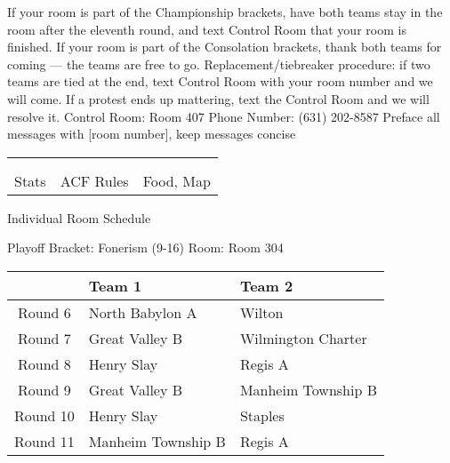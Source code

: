 \documentclass{article}%
\begin{document}
\vspace*{16pt}%
\linebreak%
If your room is part of the Championship brackets, have both teams stay in the room after the eleventh round, and text Control Room that your room is finished.\newline%
\newline%
If your room is part of the Consolation brackets, thank both teams for coming — the teams are free to go.\newline%
\newline%
Replacement/tiebreaker procedure: if two teams are tied at the end, text Control Room with your room number and we will come. If a protest ends up mattering, text the Control Room and we will resolve it.\newline%
\newline%
Control Room: Room 407\newline%
Phone Number: (631) 202{-}8587\newline%
Preface all messages with {[}room number{]}, keep messages concise%
\vspace*{30pt}%
\newline%
%
\begin{tabularx}{\textwidth}{YYY}%
  &  &  \\%
\\%
Stats&ACF Rules&Food, Map\\%
\end{tabularx}%
\newpage%
\begin{center}%
\begin{Huge}%
Individual Room Schedule%
\end{Huge}%
\vspace*{16pt}%
\linebreak%
\begin{Large}%
Playoff Bracket: Fonerism (9-16) \hfill Room: Room 304%
\end{Large}%
\end{center}%
%
\begin{tabularx}{\textwidth}{|c|Y|Y|}%
\hline%
&Team 1&Team 2\\%
\hline%
Round 6&North Babylon A&Wilton\\%
Round 7&Great Valley B&Wilmington Charter\\%
Round 8&Henry Slay&Regis A\\%
Round 9&Great Valley B&Manheim Township B\\%
Round 10&Henry Slay&Staples\\%
Round 11&Manheim Township B&Regis A\\%
\hline%
\end{tabularx}%
\end{document}
